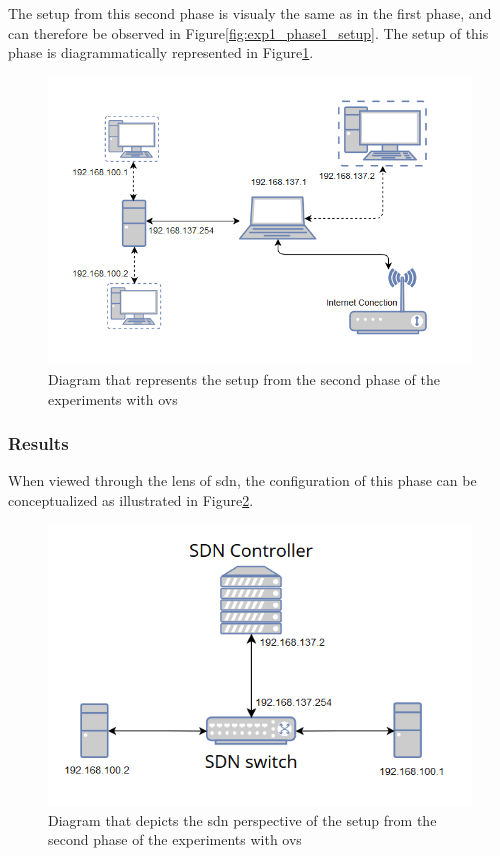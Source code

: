 The setup from this second phase is visualy the same as in the first phase, and can therefore be observed in Figure\ref{fig:exp1_phase1_setup}. The setup of this phase is diagrammatically represented in Figure\ref{fig:exp1_phase2_diagram}.

\begin{figure}
	\centering
	\includegraphics[width=\textwidth]{Chapters/Figures/tests/ovs_phase_2/setup_diagram.PNG}
	\caption{Diagram that represents the setup from the second phase of the experiments with \gls{ovs}}
	\label{fig:exp1_phase2_diagram}
\end{figure}

\subsubsection{Results}

When viewed through the lens of \gls{sdn}, the configuration of this phase can be conceptualized as illustrated in Figure\ref{fig:exp1_phase2_sdn_diagram}.

\begin{figure}
	\centering
	\includegraphics[width=\textwidth]{Chapters/Figures/tests/ovs_phase_2/sdn_diagram.PNG}
	\caption{Diagram that depicts the \gls{sdn} perspective of the setup from the second phase of the experiments with \gls{ovs}}
	\label{fig:exp1_phase2_sdn_diagram}
\end{figure}

